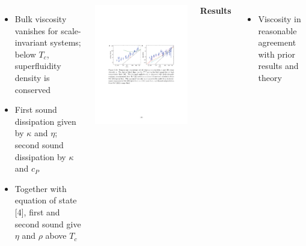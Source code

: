 \documentclass[26pt, paperwidth=36in,paperheight=48in]{tikzposter} %
\newcommand{\myfont}{\fontsize{24}{30}\selectfont}
\begin{document}
\begin{columns}
{\begin{minipage}{0.38\textwidth}
\begin{itemize}
				\item Bulk viscosity vanishes for scale-invariant systems; below $T_c$, superfluidity density is conserved 
				
				\item First sound dissipation given by $\kappa$ and $\eta$; second sound dissipation by $\kappa$ and $c_P$
				
				\item Together with equation of state [4], first and second sound give $\eta$ and $\rho$ above $T_c$
			\end{itemize}
		\end{minipage}

		\begin{minipage}{0.48\textwidth}
			\centering
			\includegraphics[width=\textwidth,
			trim=3.4cm 13cm 0cm 8.5cm,clip]{figures/transport.pdf}
		\end{minipage}
	
	
	
	\vspace{-1cm}
	\begin{minipage}{0.16\textwidth}
		\textbf{Results}
		\vspace{0.2cm}
		\myfont
		\begin{itemize}
			\item Viscosity in reasonable agreement with prior results and theory
			

\end{itemize}
\end{minipage}}
\end{columns}
\end{document}
